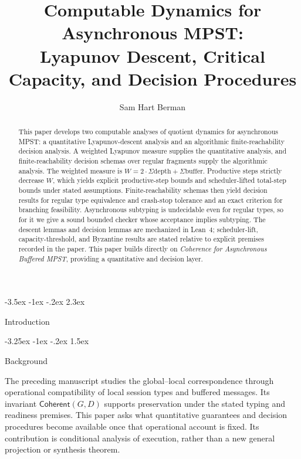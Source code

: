 \documentclass[a4paper,10pt,twocolumn,english]{article}
\title{Computable Dynamics for Asynchronous MPST:\\Lyapunov Descent, Critical Capacity, and Decision Procedures}
\author{Sam Hart Berman}
\date{\empty}
\makeatletter
\renewcommand{\section}{\@startsection{section}{1}{\z@}%
  {-3.5ex \@plus -1ex \@minus -.2ex}%
  {2.3ex}%
  {\raggedright\normalfont\large\bfseries}}
\renewcommand{\subsection}{\@startsection{subsection}{2}{\z@}%
  {-3.25ex \@plus -1ex \@minus -.2ex}%
  {1.5ex}%
  {\raggedright\normalfont\normalsize\bfseries}}
\numberwithin{equation}{section}
\theoremstyle{paperdef}
\theoremstyle{paperplain}
\theoremstyle{paperdef}
\theoremstyle{paperremark}
\newcommand{\Coherent}{\ensuremath{\mathsf{Coherent}}}
\makeatother
\begin{document}
\maketitle

\begin{abstract}
	This paper develops two computable analyses of quotient dynamics for asynchronous MPST: a quantitative Lyapunov-descent analysis and an algorithmic finite-reachability decision analysis.
	A weighted Lyapunov measure supplies the quantitative analysis, and finite-reachability
	decision schemas over regular fragments supply the algorithmic analysis. The weighted measure is
	$W = 2 \cdot \Sigma\text{depth} + \Sigma\text{buffer}$. Productive steps strictly decrease $W$,
	which yields explicit productive-step bounds and scheduler-lifted total-step bounds under stated
	assumptions. Finite-reachability schemas then yield decision results for regular type
	equivalence and crash-stop tolerance and an exact criterion for branching feasibility.
	Asynchronous subtyping is undecidable even for regular types, so for it we give a sound
	bounded checker whose acceptance implies subtyping. The descent lemmas and decision lemmas are
	mechanized in Lean~4; scheduler-lift, capacity-threshold, and Byzantine results are stated
	relative to explicit premises recorded in the paper. This paper builds directly on \emph{Coherence for Asynchronous Buffered MPST},
	providing a quantitative and decision layer.
\end{abstract}

\section{Introduction}
\label{sec:introduction}

\subsection{Background}

The preceding manuscript studies the global--local correspondence through operational compatibility
of local session types and buffered messages. Its invariant $\Coherent(G,D)$ supports preservation
under the stated typing and readiness premises. This paper asks what quantitative guarantees and
decision procedures become available once that operational account is fixed. Its contribution is
conditional analysis of execution, rather than a new general projection or synthesis theorem.
\end{document}
